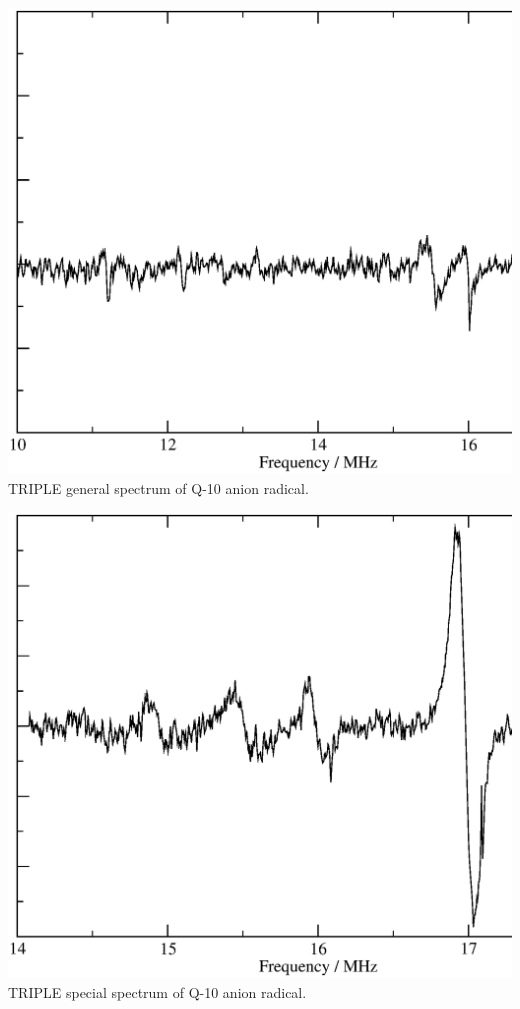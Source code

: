 \documentclass[byrevtex,amssymb,aps,pra,floatfix,letterpaper]{revtex4}
\begin{document}
\begin{center}
\includegraphics*[scale=0.4]{fig21}\\
TRIPLE general spectrum of Q-10 anion radical.
\end{center}

\begin{center}
\includegraphics*[scale=0.4]{fig22}\\
TRIPLE special spectrum of Q-10 anion radical.
\end{center}
\end{document}
